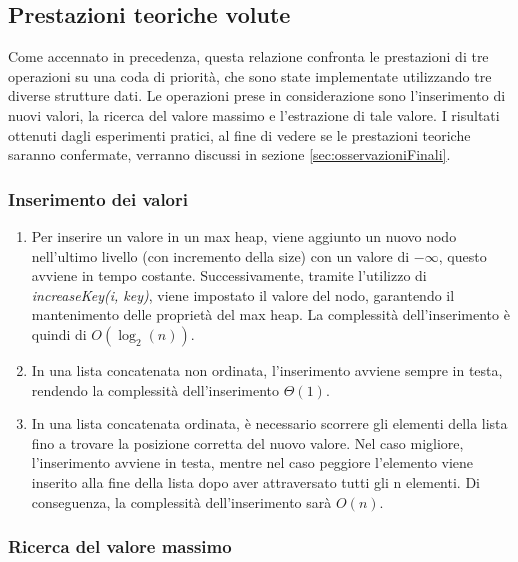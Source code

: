 \documentclass{article}
\begin{document}
\clearpage

\subsection{Prestazioni teoriche volute}

Come accennato in precedenza, questa relazione confronta le prestazioni di tre operazioni su una coda di priorità, che sono state implementate utilizzando tre diverse strutture dati. Le operazioni prese in considerazione sono l'inserimento di nuovi valori, la ricerca del valore massimo e l'estrazione di tale valore. I risultati ottenuti dagli esperimenti pratici, al fine di vedere se le prestazioni teoriche saranno confermate, verranno discussi in sezione \ref{sec:osservazioniFinali}.

\subsubsection{Inserimento dei valori}

    \begin{enumerate}
    
    \item Per inserire un valore in un max heap, viene aggiunto un nuovo nodo nell'ultimo livello (con incremento della size) con un valore di $-\infty$, questo avviene in tempo costante. Successivamente, tramite l'utilizzo di \textit{increaseKey(i, key)}, viene impostato il valore del nodo, garantendo il mantenimento delle proprietà del max heap. La complessità dell'inserimento è quindi di $O(\log_2(n))$.
    
    \item In una lista concatenata non ordinata, l'inserimento avviene sempre in testa, rendendo la complessità dell'inserimento $\Theta(1)$.
    
    \item In una lista concatenata ordinata, è necessario scorrere gli elementi della lista fino a trovare la posizione corretta del nuovo valore. Nel caso migliore, l'inserimento avviene in testa, mentre nel caso peggiore l'elemento viene inserito alla fine della lista dopo aver attraversato tutti gli n elementi. Di conseguenza, la complessità dell'inserimento sarà $O(n)$.
    
    \end{enumerate}

\subsubsection{Ricerca del valore massimo}
\end{document}
